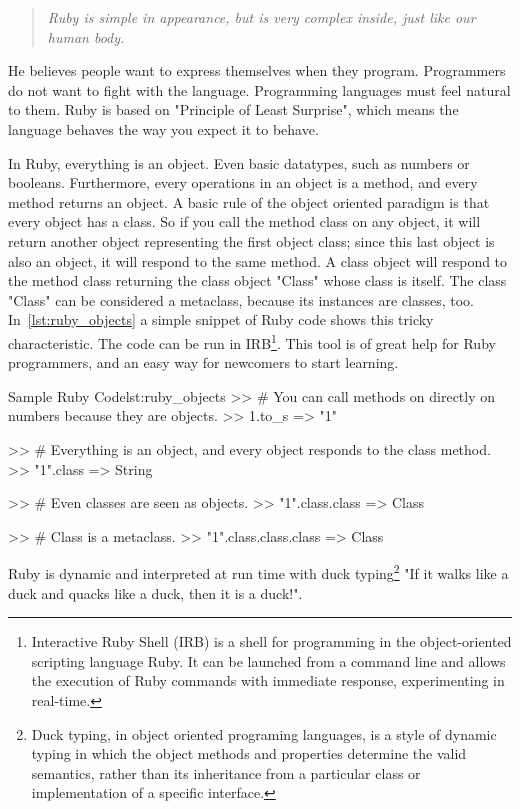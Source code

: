 \begin{quote}\emph{
  Ruby is simple in appearance, but is very complex inside, just like our human body.
}\end{quote}

He believes people want to express themselves when they program. 
Programmers do not want to fight with the language.
Programming languages must feel natural to them.
Ruby is based on "Principle of Least Surprise", which 
means the language behaves the way you expect it to behave.

In Ruby, everything is an object. Even basic datatypes, such as numbers or booleans.
Furthermore, every operations in an object is a method, and every method returns an object.
A basic rule of the object oriented paradigm is that every object has a class.
So if you call the method class on any object,
it will return another object representing the first object class; 
since this last object is also an object, 
it will respond to the same method. 
A class object will respond to the method class returning the class object "Class" whose class is itself. 
The class "Class" can be considered a metaclass, because its instances are classes, too.
In~\ref{lst:ruby_objects} a simple snippet of Ruby code shows this tricky characteristic.
The code can be run in 
\textsf{IRB}\footnote{
  Interactive Ruby Shell (IRB) is a shell for programming in the object-oriented scripting language Ruby.
  It can be launched from a command line and allows the execution of Ruby commands with immediate response, 
  experimenting in real-time.
 }.
This tool is of great help for Ruby programmers,
and an easy way for newcomers to start learning.

\begin{rubycode}{Sample Ruby Code}{lst:ruby_objects}
  >> # You can call methods on directly on numbers because they are objects.
  >> 1.to_s
  => "1"

  >> # Everything is an object, and every object responds to the class method.
  >> "1".class
  => String

  >> # Even classes are seen as objects.
  >> "1".class.class
  => Class

  >> # Class is a metaclass. 
  >> "1".class.class.class
  => Class
\end{rubycode}

Ruby is dynamic and interpreted at run time with 
\textsf{duck typing}\footnote{
  Duck typing, in object oriented programing languages, 
  is a style of dynamic typing in which the object methods and properties determine the valid semantics, 
  rather than its inheritance from a particular class or implementation of a specific interface.
} 
"If it walks like a duck and quacks like a duck, then it is a duck!".

